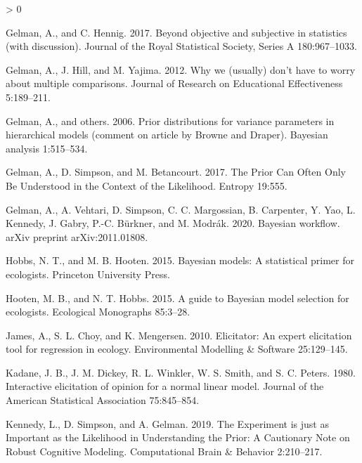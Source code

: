 \documentclass[
  12pt,
]{article}
\newlength{\cslhangindent}
\newenvironment{CSLReferences}[2] %
 {%
  \setlength{\parindent}{0pt}
  \ifodd #1 \everypar{\setlength{\hangindent}{\cslhangindent}}\ignorespaces\fi
  \ifnum #2 > 0
  \setlength{\parskip}{#2\baselineskip}
  \fi
 }%
 {}
\begin{document}
\begin{CSLReferences}{1}{0}
\leavevmode\hypertarget{ref-gelman_beyond_2017}{}%
Gelman, A., and C. Hennig. 2017. Beyond objective and subjective in
statistics (with discussion). Journal of the Royal Statistical Society,
Series A 180:967--1033.

\leavevmode\hypertarget{ref-gelman_why_2012}{}%
Gelman, A., J. Hill, and M. Yajima. 2012. Why we (usually) don't have to
worry about multiple comparisons. Journal of Research on Educational
Effectiveness 5:189--211.

\leavevmode\hypertarget{ref-gelman_prior_2006}{}%
Gelman, A., and others. 2006. Prior distributions for variance
parameters in hierarchical models (comment on article by {Browne} and
{Draper}). Bayesian analysis 1:515--534.

\leavevmode\hypertarget{ref-gelman_prior_2017}{}%
Gelman, A., D. Simpson, and M. Betancourt. 2017. The {Prior} {Can}
{Often} {Only} {Be} {Understood} in the {Context} of the {Likelihood}.
Entropy 19:555.

\leavevmode\hypertarget{ref-gelman_bayesian_2020}{}%
Gelman, A., A. Vehtari, D. Simpson, C. C. Margossian, B. Carpenter, Y.
Yao, L. Kennedy, J. Gabry, P.-C. Bürkner, and M. Modrák. 2020. Bayesian
workflow. arXiv preprint arXiv:2011.01808.

\leavevmode\hypertarget{ref-hobbs_bayesian_2015}{}%
Hobbs, N. T., and M. B. Hooten. 2015. Bayesian models: A statistical
primer for ecologists. Princeton University Press.

\leavevmode\hypertarget{ref-hooten_guide_2015}{}%
Hooten, M. B., and N. T. Hobbs. 2015. A guide to {Bayesian} model
selection for ecologists. Ecological Monographs 85:3--28.

\leavevmode\hypertarget{ref-james_elicitator_2010}{}%
James, A., S. L. Choy, and K. Mengersen. 2010. Elicitator: An expert
elicitation tool for regression in ecology. Environmental Modelling \&
Software 25:129--145.

\leavevmode\hypertarget{ref-kadane_interactive_1980}{}%
Kadane, J. B., J. M. Dickey, R. L. Winkler, W. S. Smith, and S. C.
Peters. 1980. Interactive elicitation of opinion for a normal linear
model. Journal of the American Statistical Association 75:845--854.

\leavevmode\hypertarget{ref-kennedy_experiment_2019}{}%
Kennedy, L., D. Simpson, and A. Gelman. 2019. The {Experiment} is just
as {Important} as the {Likelihood} in {Understanding} the {Prior}: A
{Cautionary} {Note} on {Robust} {Cognitive} {Modeling}. Computational
Brain \& Behavior 2:210--217.


\end{CSLReferences}
\end{document}
